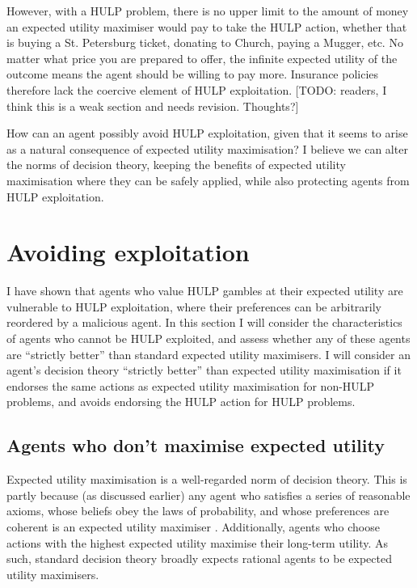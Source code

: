 \documentclass{article}
\begin{document}
However, with a HULP problem, there is no upper limit to the amount of money an expected utility maximiser would pay to take the HULP action, whether that is buying a St. Petersburg ticket, donating to Church, paying a Mugger, etc. No matter what price you are prepared to offer, the infinite expected utility of the outcome means the agent should be willing to pay more. Insurance policies therefore lack the coercive element of HULP exploitation. [TODO: readers, I think this is a weak section and needs revision. Thoughts?]

How can an agent possibly avoid HULP exploitation, given that it seems to arise as a natural consequence of expected utility maximisation? I believe we can alter the norms of decision theory, keeping the benefits of expected utility maximisation where they can be safely applied, while also protecting agents from HULP exploitation.

\section{Avoiding exploitation}

I have shown that agents who value HULP gambles at their expected utility are vulnerable to HULP exploitation, where their preferences can be arbitrarily reordered by a malicious agent. In this section I will consider the characteristics of agents who cannot be HULP exploited, and assess whether any of these agents are ``strictly better'' than standard expected utility maximisers. I will consider an agent's decision theory ``strictly better'' than expected utility maximisation if it endorses the same actions as expected utility maximisation for non-HULP problems, and avoids endorsing the HULP action for HULP problems.

\subsection{Agents who don't maximise expected utility}

Expected utility maximisation is a well-regarded norm of decision theory. This is partly because (as discussed earlier) any agent who satisfies a series of reasonable axioms, whose beliefs obey the laws of probability, and whose preferences are coherent is an expected utility maximiser \citep{von1944games}. Additionally, agents who choose actions with the highest expected utility maximise their long-term utility. As such, standard decision theory broadly expects rational agents to be expected utility maximisers.
\end{document}
